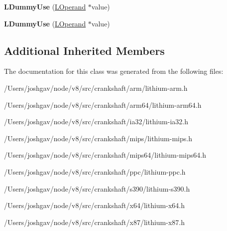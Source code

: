 \begin{DoxyCompactItemize}
\item 
{\bfseries L\+Dummy\+Use} (\hyperlink{classv8_1_1internal_1_1_l_operand}{L\+Operand} $\ast$value)\hypertarget{classv8_1_1internal_1_1_l_dummy_use_a390188ac1f610137e37f03e5d227f886}{}\label{classv8_1_1internal_1_1_l_dummy_use_a390188ac1f610137e37f03e5d227f886}

\item 
{\bfseries L\+Dummy\+Use} (\hyperlink{classv8_1_1internal_1_1_l_operand}{L\+Operand} $\ast$value)\hypertarget{classv8_1_1internal_1_1_l_dummy_use_a390188ac1f610137e37f03e5d227f886}{}\label{classv8_1_1internal_1_1_l_dummy_use_a390188ac1f610137e37f03e5d227f886}

\end{DoxyCompactItemize}
\subsection*{Additional Inherited Members}


The documentation for this class was generated from the following files\+:\begin{DoxyCompactItemize}
\item 
/\+Users/joshgav/node/v8/src/crankshaft/arm/lithium-\/arm.\+h\item 
/\+Users/joshgav/node/v8/src/crankshaft/arm64/lithium-\/arm64.\+h\item 
/\+Users/joshgav/node/v8/src/crankshaft/ia32/lithium-\/ia32.\+h\item 
/\+Users/joshgav/node/v8/src/crankshaft/mips/lithium-\/mips.\+h\item 
/\+Users/joshgav/node/v8/src/crankshaft/mips64/lithium-\/mips64.\+h\item 
/\+Users/joshgav/node/v8/src/crankshaft/ppc/lithium-\/ppc.\+h\item 
/\+Users/joshgav/node/v8/src/crankshaft/s390/lithium-\/s390.\+h\item 
/\+Users/joshgav/node/v8/src/crankshaft/x64/lithium-\/x64.\+h\item 
/\+Users/joshgav/node/v8/src/crankshaft/x87/lithium-\/x87.\+h\end{DoxyCompactItemize}
